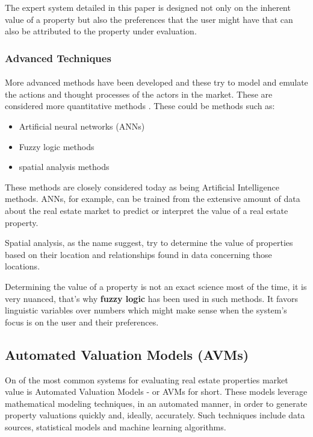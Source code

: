 \documentclass[runningheads]{llncs}
\begin{document}
The expert system detailed in this paper is designed not only on the inherent value of a property but also the preferences that the user might have that can also be attributed to the property under evaluation.

\subsubsection{Advanced Techniques}
\paragraph{}
More advanced methods have been developed and these try to model and emulate the actions and thought processes of the actors in the market. These are considered more quantitative methods \cite{methods}. These could be methods such as:
\begin{itemize}
    \item Artificial neural networks (ANNs)
    \item Fuzzy logic methods
    \item spatial analysis methods
\end{itemize}

These methods are closely considered today as being Artificial Intelligence methods. ANNs, for example, can be trained from the extensive amount of data about the real estate market to predict or interpret the value of a real estate property.

Spatial analysis, as the name suggest, try to determine the value of properties based on their location and relationships found in data concerning those locations.

Determining the value of a property is not an exact science most of the time, it is very nuanced, that's why \textbf{fuzzy logic} has been used in such methods. It favors linguistic variables over numbers which might make sense when the system's focus is on the user and their preferences.

\subsection{Automated Valuation Models (AVMs)}

On of the most common systems for evaluating real estate properties market value is Automated Valuation Models - or AVMs for short. These models leverage mathematical modeling techniques, in an automated manner, in order to generate property valuations quickly and, ideally, accurately. Such techniques include data sources, statistical models and machine learning algorithms.
\end{document}
